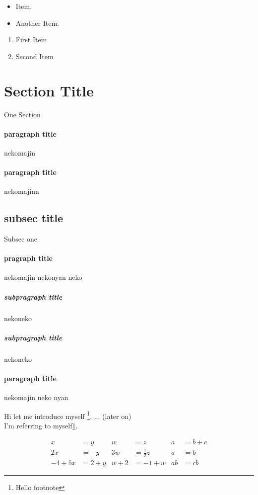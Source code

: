 \begin{itemize}
\item Item.
\item Another Item.
\end{itemize}

\begin{enumerate}
\item First Item
\item Second Item
\end{enumerate}

\section{Section Title}
One Section
\paragraph{paragraph title}
nekomajin
\paragraph{paragraph title}
nekomajinn

\subsection{subsec title}
Subsec one
\paragraph{pragraph title}
nekomajin 
nekonyan 
neko
\subparagraph{subpragraph title}
nekoneko
\subparagraph{subpragraph title}
nekoneko
\paragraph{paragraph title}
nekomajin neko nyan

\newpage

Hi let me introduce myself
\footnote{\label{myfootnote}Hello footnote}.
\newline
... (later on)\\
I'm referring to myself\ref{myfootnote}.
\newline
\newline

\begin{align*}
x&=y & w&=z & a&=b+c\\
2x&=-y & 3w&=\frac{1}{2}z & a&=b\\
-4 + 5x&=2+y & w+2&=-1+w & ab&=cb
\end{align*}

